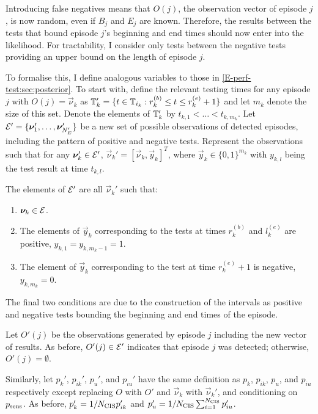 \documentclass[thesis.tex]{subfiles}
\begin{document}
Introducing false negatives means that $O(j)$, the observation vector of episode $j$, is now random, even if $B_j$ and $E_j$ are known.
Therefore, the results between the tests that bound episode $j$'s beginning and end times should now enter into the likelihood.
For tractability, I consider only tests between the negative tests providing an upper bound on the length of episode $j$.

To formalise this, I define analogous variables to those in \cref{E-perf-test:sec:posterior}.
To start with, define the relevant testing times for any episode $j$ with $O(j) = \vec{\nu}_k$ as $\mathbb{T}'_k = \{ t \in \mathbb{T}_{i_k} : r_k^{(b)} \leq t \leq r_k^{(e)} + 1 \}$ and let $m_k$ denote the size of this set.
Denote the elements of $\mathbb{T}'_k$ by $t_{k,1} < \dots < t_{k,m_k}$.
Let $\mathcal{E}' = \{ \bm{\nu}_1', \dots, \bm{\nu}_{N_E'}' \}$ be a new set of possible observations of detected episodes, including the pattern of positive and negative tests.
Represent the observations such that for any $\bm{\nu}_k' \in \mathcal{E}'$, $\vec{\nu}_k' = [\vec{\nu}_{k}, \vec{y}_k]^T$, where $\vec{y}_k \in \{ 0, 1 \}^{m_k}$ with $y_{k,l}$ being the test result at time $t_{k,l}$.

The elements of $\mathcal{E}'$ are all $\vec{\nu}_k'$ such that:
\begin{enumerate}
  \item $\bm{\nu}_k \in \mathcal{E}$.
  \item The elements of $\vec{y}_k$ corresponding to the tests at times $r_k^{(b)}$ and $l_k^{(e)}$ are positive, \ie $y_{k,1} = y_{k,m_k-1} = 1$.
  \item The element of $\vec{y}_k$ corresponding to the test at time $r_k^{(e)} + 1$ is negative, \ie $y_{k,m_k} = 0$.
\end{enumerate}
The final two conditions are due to the construction of the intervals as positive and negative tests bounding the beginning and end times of the episode.

Let $O'(j)$ be the observations generated by episode $j$ including the new vector of results.
As before, $O'(j) \in \mathcal{E}'$ indicates that episode $j$ was detected; otherwise, $O'(j) = \emptyset$.

Similarly, let $p_k'$, $p_{ik}'$, $p_u'$, and $p_{iu}'$ have the same definition as $p_k$, $p_{ik}$, $p_u$, and $p_{iu}$ respectively except replacing $O$ with $O'$ and $\vec{\nu}_k$ with $\vec{\nu}_k'$, and conditioning on $p_\text{sens}$.
As before, $p'_k = 1/N_\text{CIS} p'_{ik}$ and $p'_u = 1/N_\text{CIS} \sum_{i=1}^{N_\text{CIS}} p'_{iu}$.
\end{document}
